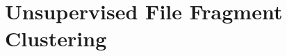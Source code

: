 \documentclass[12pt,a4paper]{report}
\begin{document}
\begin{normalsize}
\end{normalsize}



\part{Unsupervised File Fragment Clustering}
\label{part:clustering}

\chapter{}
\end{document}
